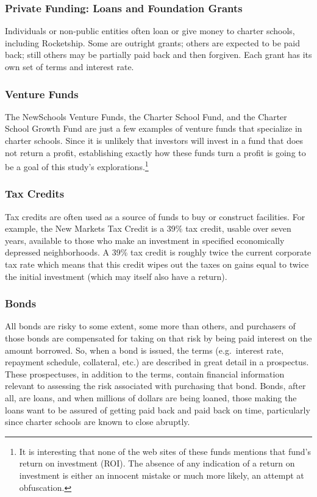 \subsubsection{Private Funding: Loans and Foundation Grants}\label{sec:private-funding}\indent

Individuals or non-public entities often loan or give money to charter schools, including Rocketship. Some are outright grants; others are expected to be paid back; still others may be partially paid back and then forgiven. Each grant has its own set of terms and interest rate.

\subsubsection{Venture Funds}\label{sec:venture-funds}\indent

The NewSchools Venture Funds, the Charter School Fund, and the Charter School Growth Fund are just a few examples of venture funds that specialize in charter schools. Since it is unlikely that investors will invest in a fund that does not return a profit, establishing exactly how these funds turn a profit is going to be a goal of this study's explorations.\footnote{It is interesting that none of the web sites of these funds mentions that fund's return on investment (ROI). The absence of any indication of a return on investment is either an innocent mistake or much more likely, an attempt at obfuscation.}

\subsubsection{Tax Credits}\label{sec:tax-credits}\indent

Tax credits are often used as a source of funds to buy or construct facilities. For example, the New Markets Tax Credit is a 39\% tax credit, usable over seven years, available to those who make an investment in specified economically depressed neighborhoods. A 39\% tax credit is roughly twice the current corporate tax rate which means that this credit wipes out the taxes on gains equal to twice the initial investment (which may itself also have a return).

\subsubsection{Bonds}\label{sec:bond-prospectuses}\indent

All bonds are risky to some extent, some more than others, and purchasers of those bonds are compensated for taking on that risk by being paid interest on the amount borrowed. So, when a bond is issued, the terms (e.g. interest rate, repayment schedule, collateral, etc.) are described in great detail in a prospectus. These prospectuses, in addition to the terms, contain financial information relevant to assessing the risk associated with purchasing that bond. Bonds, after all, are loans, and when millions of dollars are being loaned, those making the loans want to be assured of getting paid back and paid back on time, particularly since charter schools are known to close abruptly.

